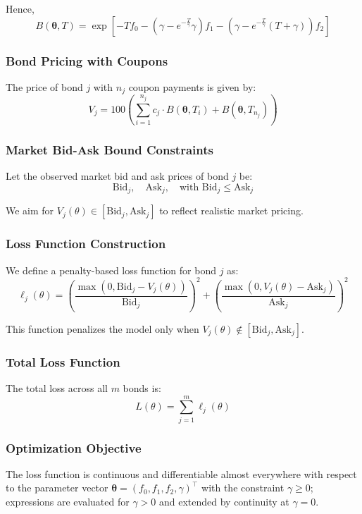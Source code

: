 \documentclass[12pt]{article}
\begin{document}
Hence,
\[
B(\boldsymbol{\theta}, T)= \exp\left[
- T f_0
- \left( \gamma - e^{- \frac{T}{\gamma}} \gamma \right) f_1
- \left( \gamma - e^{- \frac{T}{\gamma}} (T + \gamma) \right) f_2
\right]
\]

\subsubsection{Bond Pricing with Coupons}\label{subsec:bond_pricing}

The price of bond \( j \) with \( n_j \) coupon payments is given by:
\[
V_j = 100 \left( \sum_{i=1}^{n_j } c_j \cdot B(\boldsymbol{\theta}, T_{i}) +  B(\boldsymbol{\theta}, T_{n_j}) \right)
\]

\subsubsection{Market Bid-Ask Bound Constraints}

Let the observed market bid and ask prices of bond \( j \) be:
\[
\text{Bid}_j, \quad \text{Ask}_j, \quad \text{with } \text{Bid}_j \le \text{Ask}_j
\]

We aim for \( V_j(\theta) \in [\text{Bid}_j, \text{Ask}_j] \) to reflect realistic market pricing.

\subsubsection{Loss Function Construction}

We define a penalty-based loss function for bond \( j \) as:
\[
\ell_j(\theta) =
\left( \frac{\max(0, \text{Bid}_j - V_j(\theta))}{\text{Bid}_j} \right)^2 +
\left( \frac{\max(0, V_j(\theta) - \text{Ask}_j)}{\text{Ask}_j} \right)^2
\]

This function penalizes the model only when \( V_j(\theta) \notin [\text{Bid}_j, \text{Ask}_j]  \).

\subsubsection{Total Loss Function}

The total loss across all \( m \) bonds is:
\[
L(\theta) = \sum_{j=1}^m \ell_j(\theta)
\]

\subsubsection{Optimization Objective}

The loss function is continuous and differentiable almost everywhere with respect to the parameter vector \( \boldsymbol{\theta} = (f_0, f_1, f_2, \gamma)^\top \) with the constraint \( \gamma \ge 0 \); expressions are evaluated for $\gamma>0$ and extended by continuity at $\gamma=0$. 
\end{document}
